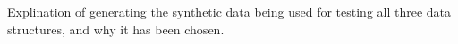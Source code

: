 Explination of generating the synthetic data being used for testing all three data structures, and why it has been chosen.